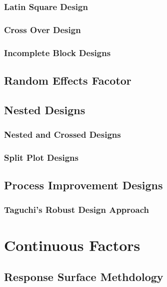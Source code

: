 \subsubsection{Latin Square Design}

\subsubsection{Cross Over Design}

\subsubsection{Incomplete Block Designs}


\subsection{Random Effects Facotor}

\subsection{Nested Designs}


\subsubsection{Nested and Crossed Designs}

\subsubsection{Split Plot Designs}




\subsection{Process Improvement Designs}

\subsubsection{Taguchi's Robust Design Approach}



\section{Continuous Factors}



\subsection{Response Surface Methdology}
\label{sec:response_surface}


